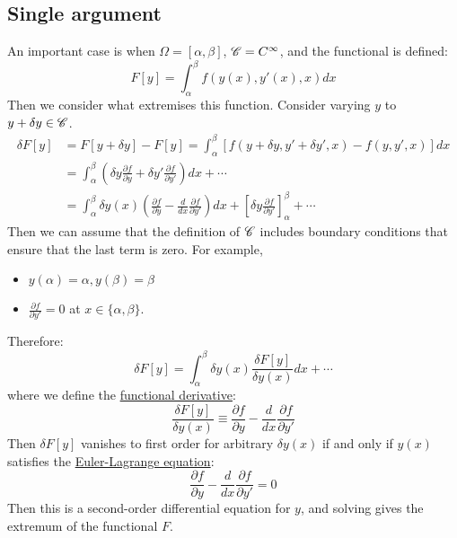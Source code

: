 \documentclass[../Main.tex]{subfiles}
\begin{document}
\subsection{Single argument}
An important case is when $\Omega = [\alpha, \beta]$, $\mathscr{C} = C^\infty$, and the functional is defined:
\begin{equation*}
    F[y] = \int_\alpha^\beta f(y(x), y'(x), x) dx
\end{equation*}
Then we consider what extremises this function. Consider varying $y$ to $y + \delta y \in \mathscr{C}$.
\begin{align*}
    \delta F[y] &= F[y + \delta y] - F[y] = \int_\alpha^\beta \left[f(y + \delta y, y' + \delta y', x) - f(y, y', x)\right]dx \\
    &= \int_\alpha^\beta \left(\delta y \frac{\partial f}{\partial y} + \delta y' \frac{\partial f}{\partial y'}\right)dx + \cdots \\
    &= \int_\alpha^\beta \delta y(x) \left(\frac{\partial f}{\partial y} - \frac{d}{dx} \frac{\partial f}{\partial y'}\right)dx + \left[\delta y \frac{\partial f}{\partial y'}\right]_\alpha^\beta + \cdots
\end{align*}
Then we can assume that the definition of $\mathscr{C}$ includes boundary conditions that ensure that the last term is zero. For example, 
\begin{itemize}
    \item $y(\alpha) = \alpha, y(\beta) = \beta$ \\
    \item $\frac{\partial f}{\partial y'} = 0$ at $x \in \{\alpha, \beta\}$.
\end{itemize}
Therefore:
\begin{equation*}
    \delta F[y] = \int_\alpha^\beta \delta y(x) \frac{\delta F[y]}{\delta y(x)} dx + \cdots
\end{equation*}
where we define the \underline{functional derivative}:
\begin{equation*}
    \frac{\delta F[y]}{\delta y(x)} \equiv \frac{\partial f}{\partial y} - \frac{d}{dx} \frac{\partial f}{\partial y'}
\end{equation*}
Then $\delta F[y]$ vanishes to first order for arbitrary $\delta y(x)$ if and only if $y(x)$ satisfies the \underline{Euler-Lagrange equation}:
\begin{equation}
    \frac{\partial f}{\partial y} - \frac{d}{dx} \frac{\partial f}{\partial y'} = 0
    \label{eqnEulerLagrange}
\end{equation}
Then this is a second-order differential equation for $y$, and solving gives the extremum of the functional $F$.
\end{document}
